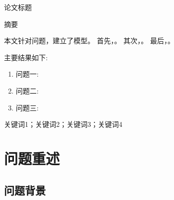 \documentclass[12pt,a4paper]{article}
\newcommand{\cumcmtitle}{论文标题}
\newcommand{\cumcmkeywords}{关键词1；关键词2；关键词3；关键词4}
\begin{document}
\begin{center}
    {\heiti{} \cumcmtitle}

    \vspace{12pt}
    {\heiti{} 摘\quad 要}
\end{center}

\vspace{6pt}


本文针对\underline{\hspace{2cm}}问题，建立了\underline{\hspace{2cm}}模型。
首先，\underline{\hspace{4cm}}。
其次，\underline{\hspace{4cm}}。
最后，\underline{\hspace{4cm}}。

主要结果如下:
\begin{enumerate}
    \item 问题一: \underline{\hspace{6cm}}
    \item 问题二: \underline{\hspace{6cm}}
    \item 问题三: \underline{\hspace{6cm}}
\end{enumerate}

\vspace{12pt}
 \cumcmkeywords

\newpage


\section{问题重述}

\subsection{问题背景}
\end{document}
